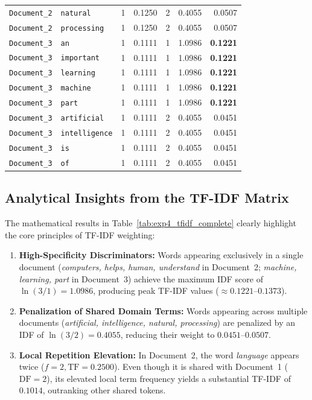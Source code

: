 \documentclass[12pt,a4paper]{report}
\begin{document}
\begin{table}[H]
\begin{tabularx}{\textwidth}{lllrrrr}
\texttt{Document\_2} & \texttt{natural} & 1 & 0.1250 & 2 & 0.4055 & 0.0507 \\
\texttt{Document\_2} & \texttt{processing} & 1 & 0.1250 & 2 & 0.4055 & 0.0507 \\
\midrule
\texttt{Document\_3} & \texttt{an} & 1 & 0.1111 & 1 & 1.0986 & \textbf{0.1221} \\
\texttt{Document\_3} & \texttt{important} & 1 & 0.1111 & 1 & 1.0986 & \textbf{0.1221} \\
\texttt{Document\_3} & \texttt{learning} & 1 & 0.1111 & 1 & 1.0986 & \textbf{0.1221} \\
\texttt{Document\_3} & \texttt{machine} & 1 & 0.1111 & 1 & 1.0986 & \textbf{0.1221} \\
\texttt{Document\_3} & \texttt{part} & 1 & 0.1111 & 1 & 1.0986 & \textbf{0.1221} \\
\texttt{Document\_3} & \texttt{artificial} & 1 & 0.1111 & 2 & 0.4055 & 0.0451 \\
\texttt{Document\_3} & \texttt{intelligence} & 1 & 0.1111 & 2 & 0.4055 & 0.0451 \\
\texttt{Document\_3} & \texttt{is} & 1 & 0.1111 & 2 & 0.4055 & 0.0451 \\
\texttt{Document\_3} & \texttt{of} & 1 & 0.1111 & 2 & 0.4055 & 0.0451 \\
\bottomrule
\end{tabularx}
\end{table}

\subsection{Analytical Insights from the TF-IDF Matrix}
The mathematical results in Table~\ref{tab:exp4_tfidf_complete} clearly highlight the core principles of TF-IDF weighting:
\begin{enumerate}
    \item \textbf{High-Specificity Discriminators:} Words appearing exclusively in a single document (\textit{computers, helps, human, understand} in Document~2; \textit{machine, learning, part} in Document~3) achieve the maximum IDF score of $\ln(3/1) = 1.0986$, producing peak TF-IDF values ($\approx 0.1221$--$0.1373$).
    \item \textbf{Penalization of Shared Domain Terms:} Words appearing across multiple documents (\textit{artificial, intelligence, natural, processing}) are penalized by an IDF of $\ln(3/2) = 0.4055$, reducing their weight to $0.0451$--$0.0507$.
    \item \textbf{Local Repetition Elevation:} In Document~2, the word \textit{language} appears twice ($f=2, \text{TF}=0.2500$). Even though it is shared with Document~1 ($\text{DF}=2$), its elevated local term frequency yields a substantial TF-IDF of $0.1014$, outranking other shared tokens.
\end{enumerate}
\end{document}
